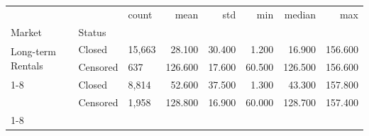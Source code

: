 \begin{tabular}{lllrrrrr}
\toprule
 &  & count & mean & std & min & median & max \\
Market & Status &  &  &  &  &  &  \\
\midrule
\multirow[t]{2}{*}{Long-term Rentals} & Closed & 15,663 & 28.100 & 30.400 & 1.200 & 16.900 & 156.600 \\
 & Censored & 637 & 126.600 & 17.600 & 60.500 & 126.500 & 156.600 \\
\cline{1-8}
\multirow[t]{2}{*}{Secondary Sales} & Closed & 8,814 & 52.600 & 37.500 & 1.300 & 43.300 & 157.800 \\
 & Censored & 1,958 & 128.800 & 16.900 & 60.000 & 128.700 & 157.400 \\
\cline{1-8}
\bottomrule
\end{tabular}
